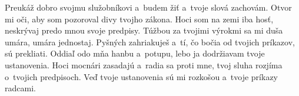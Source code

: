 Preukáž dobro svojmu služobníkovi a~budem žiť
a~tvoje slová zachovám.
\versseparator
Otvor mi oči,
aby som pozoroval divy tvojho zákona.
\versseparator
Hoci som na zemi iba hosť,
neskrývaj predo mnou svoje predpisy.
\versseparator
Túžbou za tvojimi výrokmi sa mi duša umára,
umára jednostaj.
\versseparator
Pyšných zahriakuješ
a~tí, čo bočia od tvojich príkazov, sú prekliati.
\versseparator
Oddiaľ odo mňa hanbu a~potupu,
lebo ja dodržiavam tvoje ustanovenia.
\versseparator
Hoci mocnári zasadajú a~radia sa proti mne,
tvoj sluha rozjíma o~tvojich predpisoch.
\versseparator
Veď tvoje ustanovenia sú mi rozkošou
a~tvoje príkazy radcami.